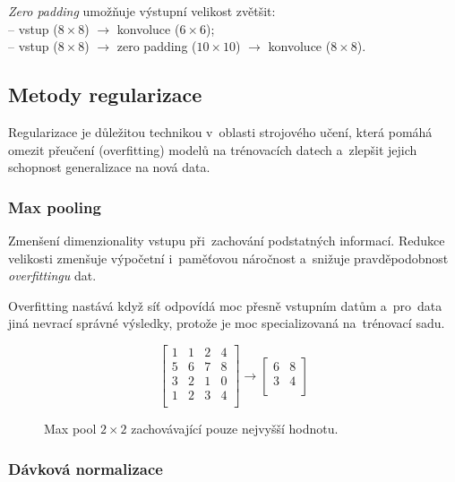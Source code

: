 \emph{Zero padding} umožňuje výstupní velikost zvětšit:
\\-- vstup ($8 \times 8$) $\rightarrow$ konvoluce ($6 \times 6$);
\\-- vstup ($8 \times 8$) $\rightarrow$ zero padding ($10 \times 10$) $\rightarrow$ konvoluce ($8 \times 8$).

\subsection{Metody regularizace}

Regularizace je důležitou technikou v~oblasti strojového učení, která pomáhá omezit přeučení (overfitting) modelů na trénovacích datech a~zlepšit jejich schopnost generalizace na nová data.

\subsubsection{Max pooling}

Zmenšení dimenzionality vstupu při~zachování podstatných informací.
Redukce velikosti zmenšuje výpočetní i~paměťovou náročnost a~snižuje pravděpodobnost \emph{overfittingu} dat.

Overfitting nastává když síť odpovídá moc přesně vstupním datům a~pro~data jiná nevrací správné výsledky, protože je moc specializovaná na~trénovací sadu.

\begin{figure}[ht]
    $$
        \left[\begin{matrix}
                1 & 1 & 2 & 4 \\
                5 & 6 & 7 & 8 \\
                3 & 2 & 1 & 0 \\
                1 & 2 & 3 & 4 \\
            \end{matrix} \right] \rightarrow \left[\begin{matrix}
                6 & 8 \\
                3 & 4 \\
            \end{matrix} \right]
    $$
    \caption{Max pool $2 \times 2$ zachovávající pouze nejvyšší hodnotu.}
\end{figure}

\subsubsection{Dávková normalizace}

